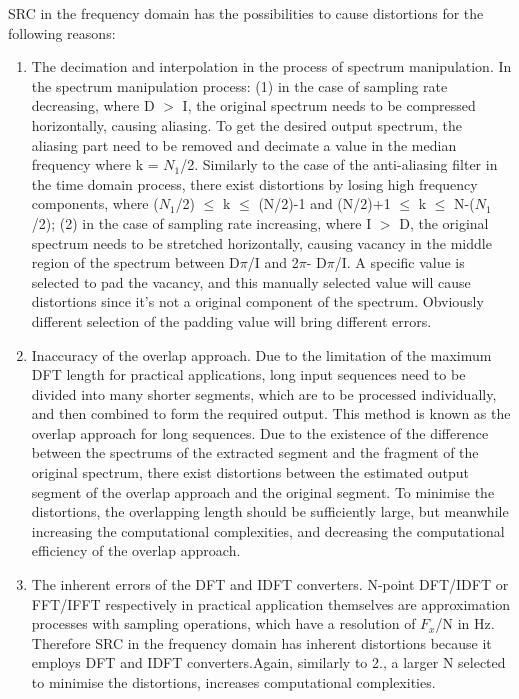 \documentclass[letterpaper,12pt]{article}
\begin{document}
SRC in the frequency domain has the possibilities to cause distortions for the following reasons:
\begin{enumerate}
\item The decimation and interpolation in the process of spectrum manipulation. 
In the spectrum manipulation process: (1) in the case of sampling rate decreasing, where D $>$ I, the original spectrum needs to be compressed horizontally, causing aliasing. To get the desired output spectrum, the aliasing part need to be removed and decimate a value in the median frequency where k = $N_{1}$/2. Similarly to the case of the anti-aliasing filter in the time domain process, there exist distortions by losing high frequency components, where ($N_{1}$/2) $\leq$ k $\leq$ (N/2)-1 and (N/2)+1 $\leq$ k $\leq$ N-($N_{1}$/2); (2) in the case of sampling rate increasing, where I $>$ D, the original spectrum needs to be stretched horizontally, causing vacancy in the middle region of the spectrum between D$\pi$/I and 2$\pi$- D$\pi$/I. A specific value is selected to pad the vacancy, and this manually selected value will cause distortions since it's not a original component of the spectrum. Obviously different selection of the padding value will bring different errors.
\item Inaccuracy of the overlap approach.
Due to the limitation of the maximum DFT length for practical applications, long input sequences need to be divided into many shorter segments, which are to be processed individually, and then combined to form the required output. This method is known as the overlap approach for long sequences. Due to the existence of the difference between the spectrums of the extracted segment and the fragment of the original spectrum, there exist distortions between the estimated output segment of the overlap approach and the original segment. To minimise the distortions, the overlapping length should be sufficiently large, but meanwhile increasing the computational complexities, and decreasing the computational efficiency of the overlap approach.
\item The inherent errors of the DFT and IDFT converters. 
N-point DFT/IDFT or FFT/IFFT respectively in practical application themselves are approximation processes with sampling operations, which have a resolution of $F_{x}$/N in Hz. Therefore SRC in the frequency domain has inherent distortions because it employs DFT and IDFT converters.Again, similarly to 2., a larger N selected to minimise the distortions, increases computational complexities.
\end{enumerate}
\end{document}
